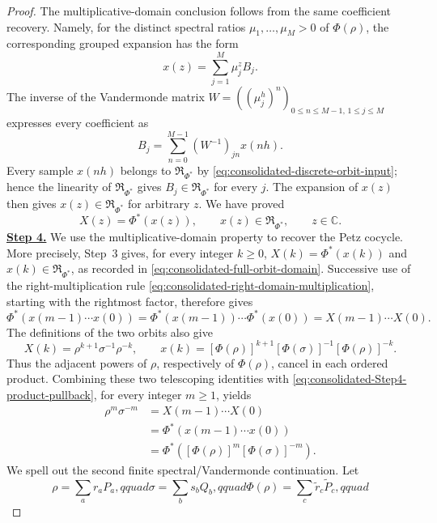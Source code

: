 \documentclass[11pt]{article}
\theoremstyle{remark}
\newcommand{\1}{\mathbbm{1}}
\begin{document}
\begin{proof}
The multiplicative-domain conclusion follows from the same
coefficient recovery.  Namely, for the distinct spectral ratios
$\mu_1,\ldots,\mu_M>0$ of $\Phi(\rho)$, the corresponding grouped
expansion has the form
\[
 x(z)=\sum_{j=1}^M\mu_j^z B_j.
\]
The inverse of the Vandermonde matrix
$W=((\mu_j^h)^n)_{0\leq n\leq M-1,\,1\leq j\leq M}$ expresses every
coefficient as
\[
 B_j=\sum_{n=0}^{M-1}(W^{-1})_{jn}x(nh).
\]
Every sample $x(nh)$ belongs to $\mathfrak R_{\Phi^*}$ by
\eqref{eq:consolidated-discrete-orbit-input}; hence the linearity of
$\mathfrak R_{\Phi^*}$ gives $B_j\in\mathfrak R_{\Phi^*}$ for every
$j$.  The expansion of $x(z)$ then gives
$x(z)\in\mathfrak R_{\Phi^*}$ for arbitrary $z$.  We have proved
\begin{equation}
 X(z)=\Phi^*(x(z)),\qquad
 x(z)\in\mathfrak R_{\Phi^*},\qquad z\in\mathbb C.
 \label{eq:consolidated-full-orbit-domain}
\end{equation}
\smallskip
\noindent\underline{\textbf{Step 4.}}\enspace
We use the multiplicative-domain property to recover the Petz cocycle.
More precisely, Step~3 gives, for every integer $k\geq0$,
$X(k)=\Phi^*(x(k))$ and
$x(k)\in\mathfrak R_{\Phi^*}$, as recorded in
\eqref{eq:consolidated-full-orbit-domain}.  Successive use of the
right-multiplication rule
\eqref{eq:consolidated-right-domain-multiplication}, starting with
the rightmost factor, therefore gives
\begin{equation}
 \Phi^*\!\left(x(m-1)\cdots x(0)\right)
 =\Phi^*(x(m-1))\cdots\Phi^*(x(0))
 =X(m-1)\cdots X(0).
 \label{eq:consolidated-Step4-product-pullback}
\end{equation}
The definitions of the two orbits also give
\[
 X(k)=\rho^{k+1}\sigma^{-1}\rho^{-k},\qquad
 x(k)=[\Phi(\rho)]^{k+1}[\Phi(\sigma)]^{-1}
       [\Phi(\rho)]^{-k}.
\]
Thus the adjacent powers of $\rho$, respectively of $\Phi(\rho)$,
cancel in each ordered product.  Combining these two telescoping
identities with \eqref{eq:consolidated-Step4-product-pullback}, for
every integer $m\geq1$, yields
\begin{align*}
 \rho^m\sigma^{-m}
 &=X(m-1)\cdots X(0)\\
 &=\Phi^*\!\left(x(m-1)\cdots x(0)\right)\\
 &=\Phi^*\!\left(
 [\Phi(\rho)]^m[\Phi(\sigma)]^{-m}\right).
\end{align*}
We spell out the second finite spectral/Vandermonde continuation.  Let
\begin{equation*}
 \rho=\sum_a r_aP_a,qquad
 \sigma=\sum_b s_bQ_b,qquad
 \Phi(\rho)=\sum_c\widetilde r_c\widetilde P_c,qquad

\end{equation*}
\end{proof}
\end{document}
